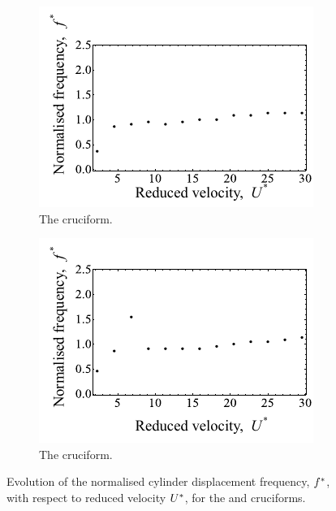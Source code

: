 \documentclass[oneside]{utmthesis}
\begin{document}
\begin{figure}
  \centering
  \begin{subfigure}[h]{0.4\textwidth}
    \includegraphics[width=\textwidth]{figs/yStrFreq2}
    \caption{The \angtw{} cruciform.}
    \label{fig:yStrFreq2}
  \end{subfigure}
  \hspace{6mm}
  \begin{subfigure}[h]{0.4\textwidth}
    \includegraphics[width=\textwidth]{figs/yStrFreq1}
    \caption{The \angon{} cruciform.}
    \label{fig:yStrFreq1}
  \end{subfigure}

  \caption{Evolution of the normalised cylinder displacement frequency, $f^{*}$, with respect to reduced velocity $U^{*}$, for the \angtw{} and \angon{} cruciforms.}
  \label{fig:yStrFreq21}
\end{figure}
\end{document}
